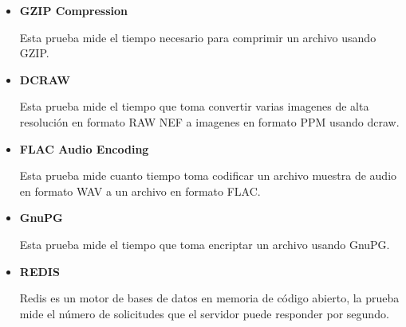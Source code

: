 \documentclass[12pt, letterpaper]{article}
\begin{document}
                        \begin{itemize}
                                \item \textbf{GZIP Compression}\vspace{.05cm}
                        
                                        Esta prueba mide el tiempo necesario 
                                        para comprimir un archivo usando GZIP.
                                        
                                \item \textbf{DCRAW}\vspace{.05cm}
                                
                                        Esta prueba mide el tiempo que toma 
                                        convertir varias imagenes de alta 
                                        resolución en formato RAW NEF a 
                                        imagenes en formato PPM usando dcraw.
                                
                                \item \textbf{FLAC Audio Encoding}\vspace{.05cm}
                
                                        Esta prueba mide cuanto tiempo toma 
                                        codificar un archivo muestra de audio 
                                        en formato WAV a un archivo en formato FLAC.

                                \item \textbf{GnuPG}\vspace{.05cm}
                                
                                        Esta prueba mide el tiempo que toma 
                                        encriptar un archivo usando GnuPG.

                                \item \textbf{REDIS}\vspace{.05cm}
                                
                                        Redis es un motor de bases de datos 
                                        en memoria de código abierto, la 
                                        prueba mide el número de solicitudes 
                                        que el servidor puede responder por 
                                        segundo.
                                

\end{itemize}
\end{document}
